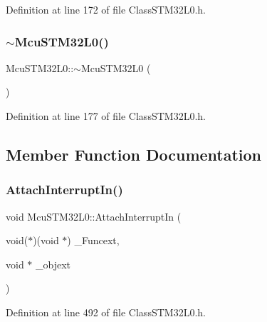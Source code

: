 Definition at line 172 of file Class\+S\+T\+M32\+L0.\+h.

\mbox{\label{class_mcu_s_t_m32_l0_af440c13e851db1f24a3a1b33990495eb}} 
\subsubsection{\texorpdfstring{$\sim$\+Mcu\+S\+T\+M32\+L0()}{~McuSTM32L0()}}
{\footnotesize\ttfamily Mcu\+S\+T\+M32\+L0\+::$\sim$\+Mcu\+S\+T\+M32\+L0 (\begin{DoxyParamCaption}{ }\end{DoxyParamCaption})\hspace{0.3cm}{\ttfamily [inline]}}



Definition at line 177 of file Class\+S\+T\+M32\+L0.\+h.



\subsection{Member Function Documentation}
\mbox{\label{class_mcu_s_t_m32_l0_a981d2d9d62185d36077d9383a4870eba}} 
\subsubsection{\texorpdfstring{Attach\+Interrupt\+In()}{AttachInterruptIn()}\hspace{0.1cm}{\footnotesize\ttfamily [1/2]}}
{\footnotesize\ttfamily void Mcu\+S\+T\+M32\+L0\+::\+Attach\+Interrupt\+In (\begin{DoxyParamCaption}\item[{void($\ast$)(void $\ast$)}]{\+\_\+\+Funcext,  }\item[{void $\ast$}]{\+\_\+objext }\end{DoxyParamCaption})\hspace{0.3cm}{\ttfamily [inline]}}



Definition at line 492 of file Class\+S\+T\+M32\+L0.\+h.

